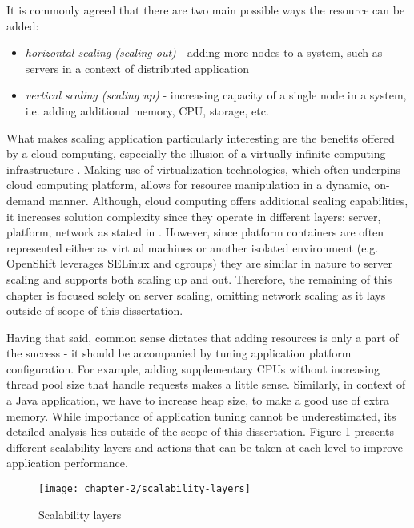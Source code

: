 It is commonly agreed that there are two main possible ways the resource can be added:
\begin{itemize}
	\item \textit{horizontal scaling (scaling out)} - adding more nodes to a system, such as servers in a context of distributed application
	\item \textit{vertical scaling (scaling up)} - increasing capacity of a single node in a system, i.e. adding additional memory, CPU, storage, etc.
\end{itemize}

What makes scaling application particularly interesting are the benefits offered by a cloud computing, especially the illusion of a virtually infinite computing infrastructure \cite{VaRoBu11}. Making use of virtualization technologies, which often underpins cloud computing platform, allows for resource manipulation in a dynamic, on-demand manner. Although, cloud computing offers additional scaling capabilities, it increases solution complexity since they operate in different layers: server, platform, network as stated in \cite{VaRoBu11}. However, since platform containers are often represented either as virtual machines or another isolated environment (e.g. OpenShift leverages SELinux and cgroups) they are similar in nature to server scaling and supports both scaling up and out. Therefore, the remaining of this chapter is focused solely on server scaling, omitting network scaling as it lays outside of scope of this dissertation.

Having that said, common sense dictates that adding resources is only a part of the success - it should be accompanied by tuning application platform configuration. For example, adding supplementary CPUs without increasing thread pool size that handle requests makes a little sense. Similarly, in context of a Java application, we have to increase heap size, to make a good use of extra memory. While importance of application tuning cannot be underestimated, its detailed analysis lies outside of the scope of this dissertation. Figure \ref{ch2:scalability-layers} presents different scalability layers and actions that can be taken at each level to improve application performance.

\begin{figure}[!ht]
  \begin{center}
    \texttt{[image: chapter-2/scalability-layers]}
  \end{center}
  \caption{Scalability layers}
  \label{ch2:scalability-layers}
\end{figure}

